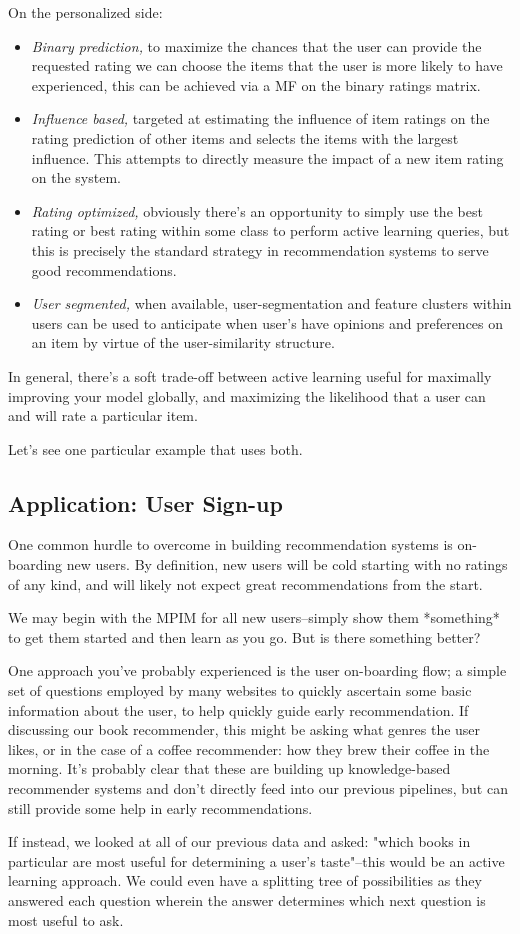 On the personalized side:

\begin{itemize}
\item \emph{Binary prediction,} to maximize the chances that the user can provide the requested rating we can choose the items that the user is more likely to have experienced, this can be achieved via a MF on the binary ratings matrix.
\item \emph{Influence based,} targeted at estimating the influence of item ratings on the rating prediction of other items and selects the items with the largest influence. This attempts to directly measure the impact of a new item rating on the system.
\item \emph{Rating optimized,} obviously there's an opportunity to simply use the best rating or best rating within some class to perform active learning queries, but this is precisely the standard strategy in recommendation systems to serve good recommendations.
\item \emph{User segmented,} when available, user-segmentation and feature clusters within users can be used to anticipate when user's have opinions and preferences on an item by virtue of the user-similarity structure.
\end{itemize}

In general, there's a soft trade-off between active learning useful for maximally improving your model globally, and maximizing the likelihood that a user can and will rate a particular item.

Let's see one particular example that uses both.

\subsection{Application: User Sign-up}

One common hurdle to overcome in building recommendation systems is on-boarding new users. By definition, new users will be cold starting with no ratings of any kind, and will likely not expect great recommendations from the start. 

We may begin with the MPIM for all new users–simply show them *something* to get them started and then learn as you go. But is there something better?

One approach you've probably experienced is the user on-boarding flow; a simple set of questions employed by many websites to quickly ascertain some basic information about the user, to help quickly guide early recommendation. If discussing our book recommender, this might be asking what genres the user likes, or in the case of a coffee recommender: how they brew their coffee in the morning. It's probably clear that these are building up knowledge-based recommender systems and don't directly feed into our previous pipelines, but can still provide some help in early recommendations. 

If instead, we looked at all of our previous data and asked: "which books in particular are most useful for determining a user's taste"–this would be an active learning approach. We could even have a splitting tree of possibilities as they answered each question wherein the answer determines which next question is most useful to ask.